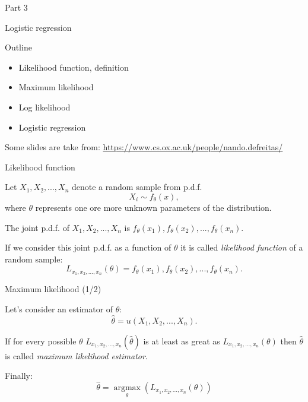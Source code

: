 \documentclass{beamer}
\DeclareMathOperator*{\argmax}{argmax}
\begin{document}
\begin{frame}
{\centerline{Part 3}}

\begin{center}
\Huge Logistic regression
\end{center}
\end{frame}


\begin{frame}
{\centerline{Outline}}
\begin{itemize}
\item Likelihood function, definition
\item Maximum likelihood
\item Log likelihood
\item Logistic regression
\end{itemize}

\vspace*{2cm}
Some slides are take from: \url{https://www.cs.ox.ac.uk/people/nando.defreitas/}
\end{frame}


\begin{frame}
{\centerline{Likelihood function }}
Let $X_1,X_2,...,X_n$ denote a random sample from p.d.f.
$$X_i \sim f_{\theta}(x),$$
where $\theta$ represents one ore more unknown parameters of the distribution.

The joint p.d.f. of $X_1, X_2, ..., X_n$ is $f_{\theta}(x_1),f_{\theta}(x_2),...,f_{\theta}(x_n)$.

If we consider this joint p.d.f. as a function of $\theta$ it is called \textit{likelihood function} of a random sample:
$$L_{x_1,x_2,...,x_n}(\theta)=f_{\theta}(x_1),f_{\theta}(x_2),...,f_{\theta}(x_n).$$
\end{frame}

\begin{frame}
{\centerline{Maximum likelihood (1/2)}}
Let's consider an estimator of $\theta$:
$$\hat{\theta} = u(X_1,X_2,...,X_n).$$

If for every possible $\theta$ $L_{x_1,x_2,...,x_n}(\hat{\theta})$ is at least as great as $L_{x_1,x_2,...,x_n}(\theta)$ then $\hat{\theta}$ is called \textit{maximum likelihood estimator}.

Finally:
$$\hat{\theta} = \argmax\limits_{\theta}(L_{x_1,x_2,...,x_n}(\theta))$$

\end{frame}
\end{document}
